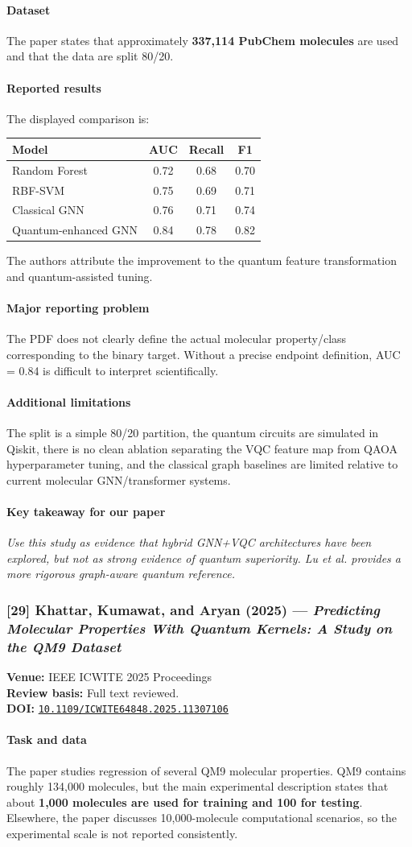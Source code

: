\documentclass[11pt]{article}
\newcommand{\reviewfield}[2]{\paragraph{#1}#2}
\newcommand{\keytakeaway}[1]{\paragraph{Key takeaway for our paper}\emph{#1}}
\newcommand{\paperdoi}[1]{\href{https://doi.org/#1}{\texttt{#1}}}
\begin{document}
\reviewfield{Dataset}{
The paper states that approximately \textbf{337,114 PubChem molecules} are used and that the data are split 80/20.
}

\reviewfield{Reported results}{
The displayed comparison is:
\begin{center}
\begin{tabular}{lccc}
\toprule
Model & AUC & Recall & F1\\
\midrule
Random Forest & 0.72 & 0.68 & 0.70\\
RBF-SVM & 0.75 & 0.69 & 0.71\\
Classical GNN & 0.76 & 0.71 & 0.74\\
Quantum-enhanced GNN & 0.84 & 0.78 & 0.82\\
\bottomrule
\end{tabular}
\end{center}
The authors attribute the improvement to the quantum feature transformation and quantum-assisted tuning.
}

\reviewfield{Major reporting problem}{
The PDF does not clearly define the actual molecular property/class corresponding to the binary target. Without a precise endpoint definition, AUC = 0.84 is difficult to interpret scientifically.
}

\reviewfield{Additional limitations}{
The split is a simple 80/20 partition, the quantum circuits are simulated in Qiskit, there is no clean ablation separating the VQC feature map from QAOA hyperparameter tuning, and the classical graph baselines are limited relative to current molecular GNN/transformer systems.
}

\keytakeaway{Use this study as evidence that hybrid GNN+VQC architectures have been explored, but not as strong evidence of quantum superiority. Lu et al. provides a more rigorous graph-aware quantum reference.}

\subsubsection{[29] Khattar, Kumawat, and Aryan (2025) --- \textit{Predicting Molecular Properties With Quantum Kernels: A Study on the QM9 Dataset}}
\textbf{Venue:} IEEE ICWITE 2025 Proceedings\\
\textbf{Review basis:} Full text reviewed.\\
\textbf{DOI:} \paperdoi{10.1109/ICWITE64848.2025.11307106}

\reviewfield{Task and data}{
The paper studies regression of several QM9 molecular properties. QM9 contains roughly 134,000 molecules, but the main experimental description states that about \textbf{1,000 molecules are used for training and 100 for testing}. Elsewhere, the paper discusses 10,000-molecule computational scenarios, so the experimental scale is not reported consistently.
}
\end{document}
